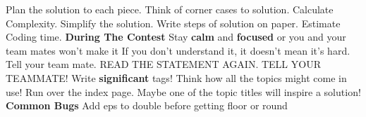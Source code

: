 Plan the solution to each piece.\newline
Think of corner cases to solution.\newline
Calculate Complexity.\newline
Simplify the solution.\newline
Write steps of solution on paper.\newline
Estimate Coding time.
\newline
\textbf{\large{During The Contest}}\newline
Stay \textbf{calm} and \textbf{focused} or you and your team mates won't make it\newline
If you don't understand it, it doesn't mean it's hard. Tell your team mate. \newline
READ THE STATEMENT AGAIN. TELL YOUR TEAMMATE! \newline
Write \textbf{significant} tags! Think how all the topics might come in use! \newline
Run over the index page. Maybe one of the topic titles will inspire a solution!
\newline
\textbf{\large{Common Bugs}}\newline
Add eps to double before getting floor or round \newline
